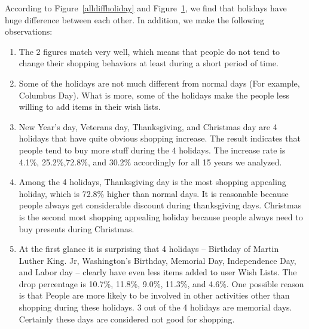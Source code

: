 \begin{figure}[!h]
\begin{minipage}{.25\textwidth}
  \label{diffholiday}
\end{minipage}
\end{figure}




According to Figure~\ref{alldiffholiday} and Figure~\ref{diffholiday}, we find that holidays have huge difference between each other. In addition, we make the following observations:
\begin{enumerate}
\item The 2 figures match very well, which means that people do not tend to change their shopping behaviors at least during a short period of time. 
\item Some of the holidays are not much different from normal days (For example, Columbus Day). What is more, some of the holidays make the people less willing to add items in their wish lists. 
\item New Year's day, Veterans day, Thanksgiving, and Christmas day are 4 holidays that have quite obvious shopping increase. The result indicates that people tend to buy more stuff during the 4 holidays. The increase rate is 4.1\%, 25.2\%,72.8\%, and 30.2\% accordingly for all 15 years we analyzed. 
\item Among the 4 holidays, Thanksgiving day is the most shopping appealing holiday, which is 72.8\% higher than normal days. It is reasonable because people always get considerable discount during thanksgiving days. Christmas is the second most shopping appealing holiday because people always need to buy presents during Christmas.
\item At the first glance it is surprising that 4 holidays -- Birthday of Martin Luther King. Jr, Washington's Birthday, Memorial Day, Independence Day, and Labor day -- clearly have even less items added to user Wish Lists. The drop percentage is 10.7\%, 11.8\%, 9.0\%, 11.3\%, and 4.6\%. One possible reason is that People are more likely to be involved in other activities other than shopping during these holidays. 3 out of the 4 holidays are memorial days. Certainly these days are considered not good for shopping. 
\end{enumerate}